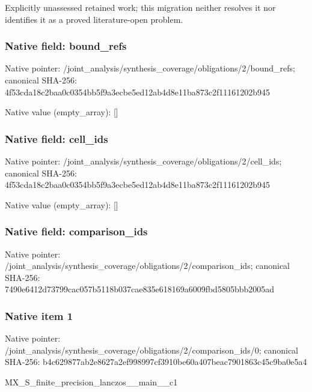 \documentclass[10pt,a4paper]{article}
\begin{document}
\begingroup\raggedright\sloppy Explicitly unassessed retained work;\allowbreak{} this migration neither resolves it nor identifies it as a proved literature-open problem.\par\endgroup

\subsubsection{Native field: bound\_\allowbreak{}refs}
Native pointer: /joint\_\allowbreak{}analysis/synthesis\_\allowbreak{}coverage/obligations/2/bound\_\allowbreak{}refs; canonical SHA-256: 4f53cda18c2baa0c0354bb5f9a3ecbe5ed12ab4d8e11ba873c2f11161202b945

Native value (empty\_\allowbreak{}array): []

\subsubsection{Native field: cell\_\allowbreak{}ids}
Native pointer: /joint\_\allowbreak{}analysis/synthesis\_\allowbreak{}coverage/obligations/2/cell\_\allowbreak{}ids; canonical SHA-256: 4f53cda18c2baa0c0354bb5f9a3ecbe5ed12ab4d8e11ba873c2f11161202b945

Native value (empty\_\allowbreak{}array): []

\subsubsection{Native field: comparison\_\allowbreak{}ids}
Native pointer: /joint\_\allowbreak{}analysis/synthesis\_\allowbreak{}coverage/obligations/2/comparison\_\allowbreak{}ids; canonical SHA-256: 7490e6412d73799cac057b5118b037cae835e618169a6009fbd5805bbb2005ad

\subsubsection{Native item 1}
Native pointer: /joint\_\allowbreak{}analysis/synthesis\_\allowbreak{}coverage/obligations/2/comparison\_\allowbreak{}ids/0; canonical SHA-256: b4c629877ab2e8627a2ef998997cf3910be60a407beac7901863c45c9ba0e5a4

\begingroup\raggedright\sloppy MX\_\allowbreak{}S\_\allowbreak{}finite\_\allowbreak{}precision\_\allowbreak{}lanczos\_\allowbreak{}\_\allowbreak{}main\_\allowbreak{}\_\allowbreak{}c1\par\endgroup
\end{document}
